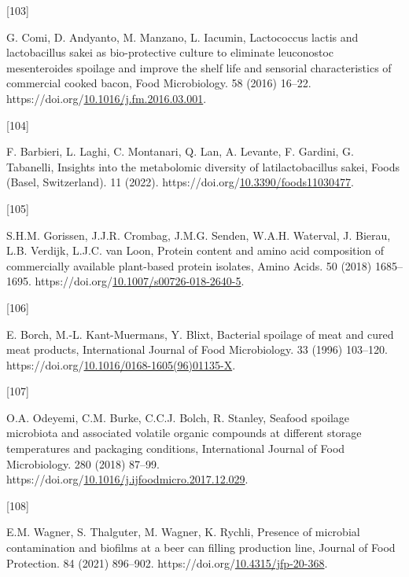 \documentclass[preprint,3p,
a4paper]{elsarticle} %
\newlength{\cslhangindent}
\newlength{\csllabelwidth}
\newlength{\cslentryspacingunit} %
\newenvironment{CSLReferences}[2] %
 {%
  \setlength{\parindent}{0pt}
  \ifodd #1
  \let\oldpar\par
  \def\par{\hangindent=\cslhangindent\oldpar}
  \fi
  \setlength{\parskip}{#2\cslentryspacingunit}
 }%
 {}
\newcommand{\CSLLeftMargin}[1]{\parbox[t]{\csllabelwidth}{#1}}
\newcommand{\CSLRightInline}[1]{\parbox[t]{\linewidth - \csllabelwidth}{#1}\break}
\begin{document}
\begin{CSLReferences}{0}{0}
\leavevmode{}%
\CSLLeftMargin{{[}103{]} }%
\CSLRightInline{G. Comi, D. Andyanto, M. Manzano, L. Iacumin,
Lactococcus lactis and lactobacillus sakei as bio-protective culture to
eliminate leuconostoc mesenteroides spoilage and improve the shelf life
and sensorial characteristics of commercial cooked bacon, Food
Microbiology. 58 (2016) 16--22.
https://doi.org/\href{https://doi.org/10.1016/j.fm.2016.03.001}{10.1016/j.fm.2016.03.001}.}

\leavevmode{}%
\CSLLeftMargin{{[}104{]} }%
\CSLRightInline{F. Barbieri, L. Laghi, C. Montanari, Q. Lan, A. Levante,
F. Gardini, G. Tabanelli, Insights into the metabolomic diversity of
latilactobacillus sakei, Foods (Basel, Switzerland). 11 (2022).
https://doi.org/\href{https://doi.org/10.3390/foods11030477}{10.3390/foods11030477}.}

\leavevmode{}%
\CSLLeftMargin{{[}105{]} }%
\CSLRightInline{S.H.M. Gorissen, J.J.R. Crombag, J.M.G. Senden, W.A.H.
Waterval, J. Bierau, L.B. Verdijk, L.J.C. van Loon, Protein content and
amino acid composition of commercially available plant-based protein
isolates, Amino Acids. 50 (2018) 1685--1695.
https://doi.org/\href{https://doi.org/10.1007/s00726-018-2640-5}{10.1007/s00726-018-2640-5}.}

\leavevmode{}%
\CSLLeftMargin{{[}106{]} }%
\CSLRightInline{E. Borch, M.-L. Kant-Muermans, Y. Blixt, Bacterial
spoilage of meat and cured meat products, International Journal of Food
Microbiology. 33 (1996) 103--120.
https://doi.org/\href{https://doi.org/10.1016/0168-1605(96)01135-X}{10.1016/0168-1605(96)01135-X}.}

\leavevmode{}%
\CSLLeftMargin{{[}107{]} }%
\CSLRightInline{O.A. Odeyemi, C.M. Burke, C.C.J. Bolch, R. Stanley,
Seafood spoilage microbiota and associated volatile organic compounds at
different storage temperatures and packaging conditions, International
Journal of Food Microbiology. 280 (2018) 87--99.
https://doi.org/\href{https://doi.org/10.1016/j.ijfoodmicro.2017.12.029}{10.1016/j.ijfoodmicro.2017.12.029}.}

\leavevmode{}%
\CSLLeftMargin{{[}108{]} }%
\CSLRightInline{E.M. Wagner, S. Thalguter, M. Wagner, K. Rychli,
Presence of microbial contamination and biofilms at a beer can filling
production line, Journal of Food Protection. 84 (2021) 896--902.
https://doi.org/\href{https://doi.org/10.4315/jfp-20-368}{10.4315/jfp-20-368}.}


\end{CSLReferences}
\end{document}
